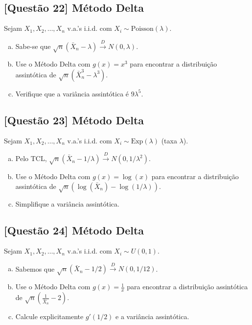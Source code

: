 \documentclass[12pt,a4paper]{article}
\begin{document}
\subsection*{[Questão 22] Método Delta}

Sejam $X_1, X_2, \ldots, X_n$ v.a.'s i.i.d. com $X_i \sim \text{Poisson}(\lambda)$.

\begin{enumerate}[(a)]
    \item Sabe-se que $\sqrt{n}(\bar{X}_n - \lambda) \xrightarrow{D} N(0, \lambda)$.
    \item Use o Método Delta com $g(x) = x^3$ para encontrar a distribuição assintótica de $\sqrt{n}(\bar{X}_n^3 - \lambda^3)$.
    \item Verifique que a variância assintótica é $9\lambda^5$.
\end{enumerate}

\subsection*{[Questão 23] Método Delta}

Sejam $X_1, X_2, \ldots, X_n$ v.a.'s i.i.d. com $X_i \sim \text{Exp}(\lambda)$ (taxa $\lambda$).

\begin{enumerate}[(a)]
    \item Pelo TCL, $\sqrt{n}(\bar{X}_n - 1/\lambda) \xrightarrow{D} N(0, 1/\lambda^2)$.
    \item Use o Método Delta com $g(x) = \log(x)$ para encontrar a distribuição assintótica de $\sqrt{n}(\log(\bar{X}_n) - \log(1/\lambda))$.
    \item Simplifique a variância assintótica.
\end{enumerate}

\subsection*{[Questão 24] Método Delta}

Sejam $X_1, X_2, \ldots, X_n$ v.a.'s i.i.d. com $X_i \sim U(0, 1)$.

\begin{enumerate}[(a)]
    \item Sabemos que $\sqrt{n}(\bar{X}_n - 1/2) \xrightarrow{D} N(0, 1/12)$.
    \item Use o Método Delta com $g(x) = \frac{1}{x}$ para encontrar a distribuição assintótica de $\sqrt{n}\left(\frac{1}{\bar{X}_n} - 2\right)$.
    \item Calcule explicitamente $g'(1/2)$ e a variância assintótica.
\end{enumerate}
\end{document}
